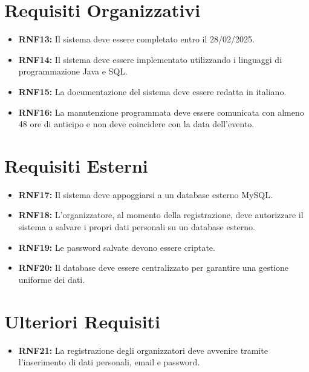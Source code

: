 \documentclass[a4paper,12pt]{article}
\begin{document}
\section*{\textcolor{sectioncolor}{Requisiti Organizzativi}}
\textcolor{textcolor}{
\begin{itemize}
    \item \textbf{RNF13:} Il sistema deve essere completato entro il 28/02/2025.
    \item \textbf{RNF14:} Il sistema deve essere implementato utilizzando i linguaggi di programmazione Java e SQL.
    \item \textbf{RNF15:} La documentazione del sistema deve essere redatta in italiano.
    \item \textbf{RNF16:} La manutenzione programmata deve essere comunicata con almeno 48 ore di anticipo e non deve coincidere con la data dell’evento.
\end{itemize}
}

\section*{\textcolor{sectioncolor}{Requisiti Esterni}}
\textcolor{textcolor}{
\begin{itemize}
    \item \textbf{RNF17:} Il sistema deve appoggiarsi a un database esterno MySQL.
    \item \textbf{RNF18:} L’organizzatore, al momento della registrazione, deve autorizzare il sistema a salvare i propri dati personali su un database esterno.
    \item \textbf{RNF19:}\textbf{ }Le password salvate devono essere criptate.
    \item \textbf{RNF20:} Il database deve essere centralizzato per garantire una gestione uniforme dei dati.
\end{itemize}
}

\section*{\textcolor{sectioncolor}{Ulteriori Requisiti}}
\textcolor{textcolor}{
\begin{itemize}
    \item \textbf{RNF21:} La registrazione degli organizzatori deve avvenire tramite l'inserimento di dati personali, email e password.
\end{itemize}
}
\end{document}
